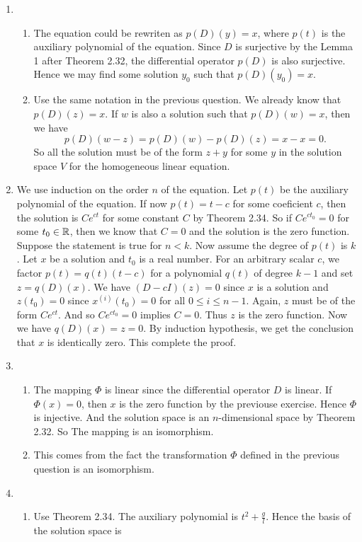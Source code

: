 \begin{enumerate}
\item \begin{enumerate}
\item The equation could be rewriten as $p(D)(y)=x$, where $p(t)$ is the auxiliary polynomial of the equation. Since $D$ is surjective by the Lemma 1 after Theorem 2.32, the differential operator $p(D)$ is also surjective. Hence we may find some solution $y_0$ such that $p(D)(y_0)=x$.
\item Use the same notation in the previous question. We already know that $p(D)(z)=x$. If $w$ is also a solution such that $p(D)(w)=x$, then we have 
\[p(D)(w-z)=p(D)(w)-p(D)(z)=x-x=0.\]
So all the solution must be of the form $z+y$ for some $y$ in the solution space $V$ for the homogeneous linear equation.
\end{enumerate}
\item We use induction on the order $n$ of the equation. Let $p(t)$ be the auxiliary polynomial of the equation. If now $p(t)=t-c$ for some coeficient $c$, then the solution is $Ce^{ct}$ for some constant $C$ by Theorem 2.34. So if $Ce^{ct_0}=0$ for some $t_0\in \mathbb{R}$, then we know that $C=0$ and the solution is the zero function. Suppose the statement is true for $n<k$. Now assume the degree of $p(t)$ is $k$. Let $x$ be a solution and $t_0$ is a real number. For an arbitrary scalar $c$, we factor $p(t)=q(t)(t-c)$ for a polynomial $q(t)$ of degree $k-1$ and set $z=q(D)(x)$. We have $(D-cI)(z)=0$ since $x$ is a solution and $z(t_0)=0$ since $x^{(i)}(t_0)=0$ for all $0\leq i\leq n-1$. Again, $z$ must be of the form $Ce^{ct}$. And so $Ce^{ct_0}=0$ implies $C=0$. Thus $z$ is the zero function. Now we have $q(D)(x)=z=0$. By induction hypothesis, we get the conclusion that $x$ is identically zero. This complete the proof.
\item \begin{enumerate}
\item The mapping $\Phi $ is linear since the differential operator $D$ is linear. If $\Phi(x)=0$, then $x$ is the zero function by the previouse exercise. Hence $\Phi$ is injective. And the solution space is an $n$-dimensional space by Theorem 2.32. So The mapping is an isomorphism.
\item This comes from the fact the transformation $\Phi$ defined in the previous question is an isomorphism.
\end{enumerate}
\item \begin{enumerate}
\item Use Theorem 2.34. The auxiliary polynomial is $t^2+\frac{g}{l}$. Hence the basis of the solution space is 

\end{enumerate}
\end{enumerate}
